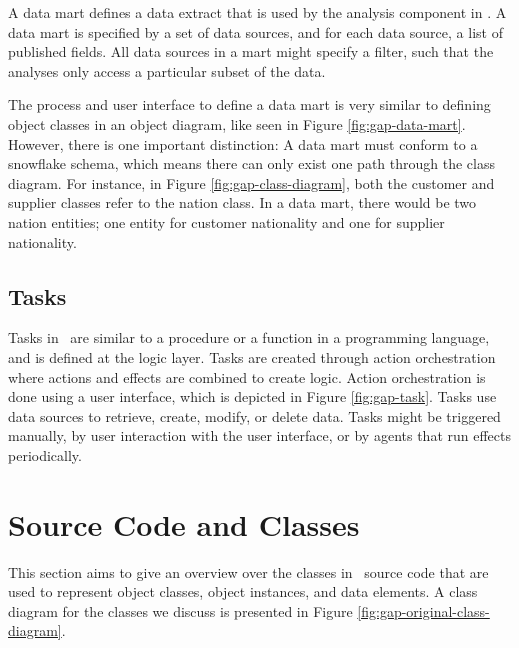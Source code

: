 A data mart defines a data extract that is used by the analysis component in \gap. A data mart is specified by a set of data sources, and for each data source, a list of published fields. All data sources in a mart might specify a filter, such that the analyses only access a particular subset of the data. 

The process and user interface to define a data mart is very similar to defining object classes in an object diagram, like seen in Figure \ref{fig:gap-data-mart}. However, there is one important distinction: A data mart must conform to a snowflake schema, which means there can only exist one path through the class diagram. For instance, in Figure \ref{fig:gap-class-diagram}, both the customer and supplier classes refer to the nation class. In a data mart, there would be two nation entities; one entity for customer nationality and one for supplier nationality.

\subsection{Tasks}
\label{sub:Tasks}
Tasks in \gap~are similar to a procedure or a function in a programming language, and is defined at the logic layer. Tasks are created through action orchestration where actions and effects are combined to create logic. Action orchestration is done using a user interface, which is depicted in Figure \ref{fig:gap-task}. Tasks use data sources to retrieve, create, modify, or delete data. Tasks might be triggered manually, by user interaction with the user interface, or by agents that run effects periodically. 

\section{Source Code and Classes}
\label{sec:Source Code and Classes}
This section aims to give an overview over the classes in \gap~source code that are used to represent object classes, object instances, and data elements. A class diagram for the classes we discuss is presented in Figure \ref{fig:gap-original-class-diagram}.

